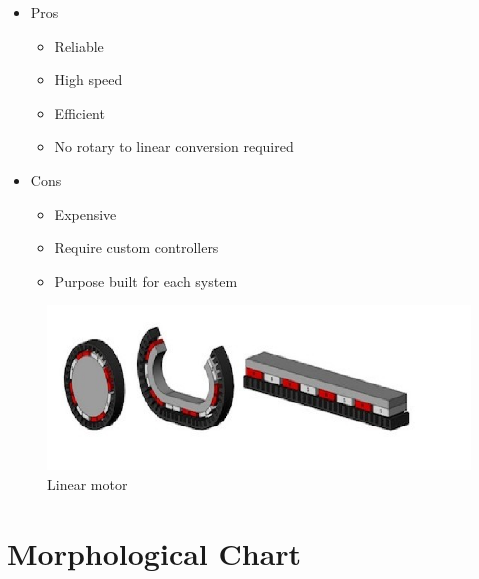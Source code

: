 \documentclass[11pt]{article}
\begin{document}
\begin{itemize}		
\item Pros
\begin{itemize}
		\item  Reliable
		\item  High speed
		\item  Efficient
		\item  No rotary to linear conversion required
	\end{itemize}		
\end{itemize}	 
 	
\begin{itemize}		
\item Cons
\begin{itemize}
		\item    Expensive
		\item    Require custom controllers
		\item    Purpose built for each system
	
	\end{itemize}		
\end{itemize}	
\begin{figure}[hbtp]
\caption{Linear motor}
\centering
\includegraphics[scale=0.5]{build/linearMotor.png}
\end{figure}

\newpage
 
 
\section{Morphological Chart}
 	
\end{document}
